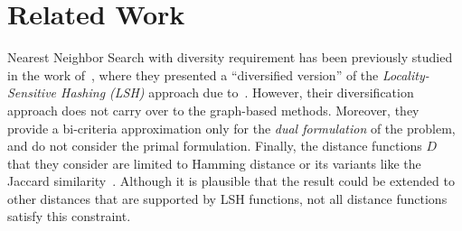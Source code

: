 \section{Related Work}
Nearest Neighbor Search with diversity requirement has been previously studied in the work of~\cite{abbar2013real,abbar2013diverse}, where they presented a ``diversified version'' of the {\em Locality-Sensitive Hashing (LSH)} approach due to~\cite{indyk1998approximate}. However, their diversification approach does not carry over to the graph-based methods.
Moreover, they provide a bi-criteria approximation only for the {\em dual formulation} of the problem, and do not consider the primal formulation.
Finally, the distance functions $D$ that they consider are limited to Hamming distance or its variants like the Jaccard similarity~\cite{abbar2013real}. Although it is plausible that the result could be extended to other distances that are supported by LSH functions, not all distance functions satisfy this constraint.